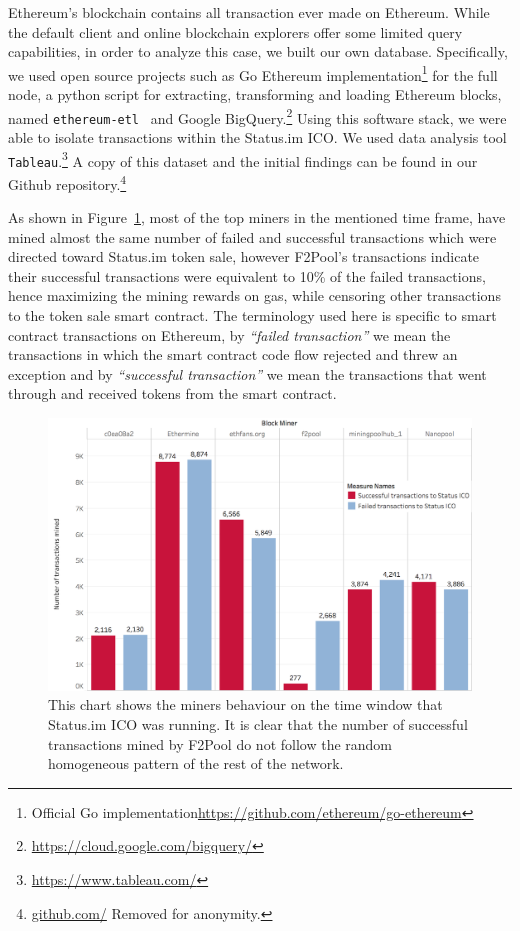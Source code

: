 Ethereum's blockchain contains all transaction ever made on Ethereum. While the default client and online blockchain explorers offer some limited query capabilities, in order to analyze this case, we built our own database. Specifically, we used open source projects such as Go Ethereum implementation\footnote{Official Go implementation\url{https://github.com/ethereum/go-ethereum}} for the full node, a python script for extracting, transforming and loading Ethereum blocks, named \texttt{ethereum-etl}~\cite{ethereumetl} and Google BigQuery.\footnote{\url{https://cloud.google.com/bigquery/}} Using this software stack, we were able to isolate transactions within the Status.im ICO. We used data analysis tool \texttt{Tableau}.\footnote{\url{https://www.tableau.com/}} A copy of this dataset and the initial findings can be found in our Github repository.\footnote{\url{github.com/} Removed for anonymity.}

As shown in Figure~\ref{fig:Transactions_miners_while_status_ico_cut}, most of the top miners in the mentioned time frame, have mined almost the same number of failed and successful transactions which were directed toward Status.im token sale, however F2Pool's transactions indicate their successful transactions were equivalent to 10\% of the failed transactions, hence maximizing the mining rewards on gas, while censoring other transactions to the token sale smart contract. The terminology used here is specific to smart contract transactions on Ethereum, by \textit{``failed transaction''} we mean the transactions in which the smart contract code flow rejected and threw an exception and by \textit{``successful transaction''} we mean the transactions that went through and received tokens from the smart contract. 


\begin{figure}[t]
\centering
\includegraphics[width=0.7\linewidth]{figures/Transactions_miners_while_status_ico_cut_only_icotx.png}
\caption{ This chart shows the miners behaviour on the time window that Status.im ICO was running. It is clear that the number of successful transactions mined by F2Pool do not follow the random homogeneous pattern of the rest of the network. \label{fig:Transactions_miners_while_status_ico_cut}} 
\end{figure}

